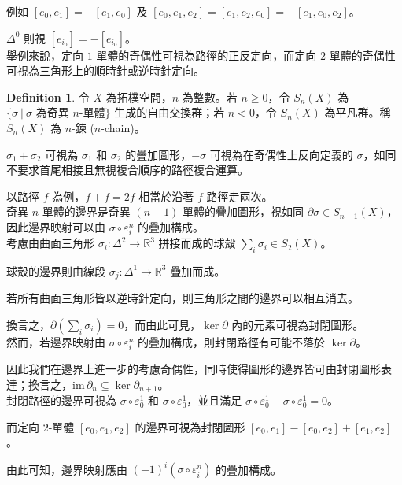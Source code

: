 \documentclass[12pt]{article}
\theoremstyle{definition}
\newtheorem{definition}{Definition}[section]
\newcommand\<{\langle}
\renewcommand\>{\rangle}
\newcommand\im{\mathrm{im}\hspace{2pt}}
\begin{document}
\begin{CJK}{UTF8}{bsmi}
例如 $[e_0, e_1]=-[e_1, e_0]$ 及 $[e_0, e_1, e_2]=[e_1, e_2, e_0]=-[e_1, e_0, e_2]$。

$\Delta^0$ 則視 $[e_{i_0}]=-[e_{i_0}]$。 \\

舉例來說，定向 $1$-單體的奇偶性可視為路徑的正反定向，而定向 $2$-單體的奇偶性可視為三角形上的順時針或逆時針定向。

\begin{definition}
    令 $X$ 為拓樸空間，$n$ 為整數。若 $n\ge0$，令 $S_n(X)$ 為 $\{\sigma\ |\ \sigma\text{ 為奇異 }n\text{-單體}\}$ 生成的自由交換群；若 $n<0$，令 $S_n(X)$ 為平凡群。稱 $S_n(X)$ 為 $n$-鍊 ($n$-chain)。
\end{definition}

$\sigma_1+\sigma_2$ 可視為 $\sigma_1$ 和 $\sigma_2$ 的疊加圖形，$-\sigma$ 可視為在奇偶性上反向定義的 $\sigma$，如同不要求首尾相接且無視複合順序的路徑複合運算。

以路徑 $f$ 為例，$f+f=2f$ 相當於沿著 $f$ 路徑走兩次。 \\

奇異 $n$-單體的邊界是奇異 $(n-1)$-單體的疊加圖形，視如同 $\partial\sigma\in S_{n-1}(X)$，因此邊界映射可以由 $\sigma\circ\varepsilon^n_i$ 的疊加構成。 \\

考慮由曲面三角形 $\sigma_i:\Delta^2\to\mathbb{R}^3$ 拼接而成的球殼 $\sum_i\sigma_i\in S_2(X)$。

球殼的邊界則由線段 $\sigma_j:\Delta^1\to\mathbb{R}^3$ 疊加而成。

若所有曲面三角形皆以逆時針定向，則三角形之間的邊界可以相互消去。

換言之，$\partial\left(\sum_i\sigma_i\right)=0$，而由此可見，$\ker\partial$ 內的元素可視為封閉圖形。 \\

然而，若邊界映射由 $\sigma\circ\varepsilon^n_i$ 的疊加構成，則封閉路徑有可能不落於 $\ker\partial$。

因此我們在邊界上進一步的考慮奇偶性，同時使得圖形的邊界皆可由封閉圖形表達；換言之，$\im\partial_n\subseteq\ker\partial_{n+1}$。 \\

封閉路徑的邊界可視為 $\sigma\circ\varepsilon^1_0$ 和 $\sigma\circ\varepsilon^1_0$，並且滿足 $\sigma\circ\varepsilon^1_0-\sigma\circ\varepsilon^1_0=0$。

而定向 $2$-單體 $[e_0, e_1, e_2]$ 的邊界可視為封閉圖形 $[e_0, e_1]-[e_0, e_2]+[e_1, e_2]$。

由此可知，邊界映射應由 $(-1)^i (\sigma\circ\varepsilon^n_i)$ 的疊加構成。


\end{CJK}
\end{document}
